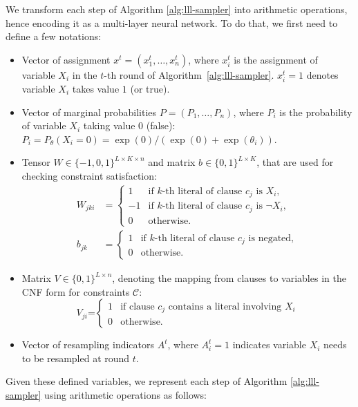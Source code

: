 We transform each step of Algorithm \ref{alg:lll-sampler} into arithmetic
operations, hence encoding it as a multi-layer neural network.
%
To do that, we first need to define a few notations:
\begin{itemize}[align=left, leftmargin=0pt, labelwidth=0pt, itemindent=!]
    \item Vector of assignment $x^t=(x^t_1, \dots, x^t_n)$, where $x_i^t$ is the
          assignment of variable $X_i$ in the $t$-th round of
          Algorithm~\ref{alg:lll-sampler}. $x^t_i=1$ denotes variable $X_i$ takes value
          $1$ (or true).
    \item Vector of marginal probabilities $P=(P_1, \ldots, P_n)$, where $P_i$ is the
          probability of variable $X_i$ taking value $0$ (false): $P_i = P_\theta(X_i=0)
              = {\exp(0)}/{(\exp(0)+\exp(\theta_i))}$.
    \item Tensor $W\in\{-1, 0, 1\}^{L\times K\times n}$ and matrix $b\in\{0,1\}^{L\times
              K}$, that are used for checking constraint satisfaction:
          \begin{align}
              W_{jki} & =\begin{cases}
                             1  & \text{if $k$-th literal of clause $c_j$ is  }  X_i,    \\
                             -1 & \text{if $k$-th literal of clause $c_j$ is } \neg X_i, \\
                             0  & \text{otherwise}.
                         \end{cases} \label{eq:weight} \\
              b_{jk}  & =\begin{cases}
                             1 & \text{if $k$-th literal of clause $c_j$ is negated}, \\
                             0 & \text{otherwise}.
                         \end{cases}\label{eq:bias}
          \end{align}
    \item Matrix $V\in\{0,1\}^{L\times n}$, denoting the mapping from clauses to
          variables in the CNF form for constraints $\mathcal{C}$:
          \begin{equation} \label{eq:mapping-matrix}
              V_{ji}\mbox{=}\begin{cases}
                  1 & \text{if clause $c_j$ contains a literal involving $X_i$} \\
                  0 & \text{otherwise}.
              \end{cases}
          \end{equation}
    \item Vector of resampling indicators $A^t$, where $A^t_{i}=1$ indicates variable
          $X_i$ needs to be resampled at round $t$.
\end{itemize}
Given these defined variables, we represent each step of Algorithm \ref{alg:lll-sampler} using arithmetic operations as follows:

